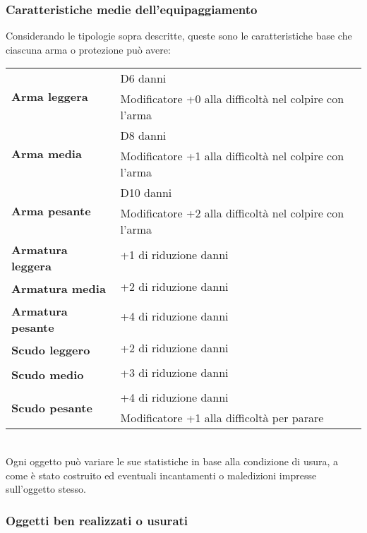 \documentclass[../manuale_main.tex]{subfiles}
\begin{document}
\subsubsection{Caratteristiche medie dell'equipaggiamento}
Considerando le tipologie sopra descritte, queste sono le caratteristiche base che ciascuna arma o protezione può avere:\\
\renewcommand{\arraystretch}{1.2}
\begin{tabular}{|l l| }

\hline
\multirow{2}{8em}{\textbf{Arma leggera}}&D6 danni \\&Modificatore +0 alla difficoltà nel colpire con l'arma\\
\hline
\multirow{2}{8em}{\textbf{Arma media}}&D8 danni \\&Modificatore +1 alla difficoltà nel colpire con l'arma\\
\hline
\multirow{2}{8em}{\textbf{Arma pesante}}&D10 danni \\&Modificatore +2 alla difficoltà nel colpire con l'arma\\
\hline

\multirow{2}{8em}{\textbf{Armatura leggera}}&+1 di riduzione danni\\&\\
\hline
\multirow{2}{8em}{\textbf{Armatura media}}&+2 di riduzione danni\\&\\
\hline
\multirow{2}{8em}{\textbf{Armatura pesante}}&+4 di riduzione danni\\&\\
\hline

\multirow{2}{8em}{\textbf{Scudo leggero}}&+2 di riduzione danni\\&\\
\hline
\multirow{2}{8em}{\textbf{Scudo medio}}&+3 di riduzione danni\\&\\
\hline
\multirow{2}{8em}{\textbf{Scudo pesante}}&+4 di riduzione danni\\&Modificatore +1 alla difficoltà per parare\\
\hline
\end{tabular}
\mbox{}\\

Ogni oggetto può variare le sue statistiche in base alla condizione di usura, a come è stato costruito ed eventuali incantamenti o maledizioni impresse sull'oggetto stesso.



\subsubsection{Oggetti ben realizzati o usurati}
\end{document}

